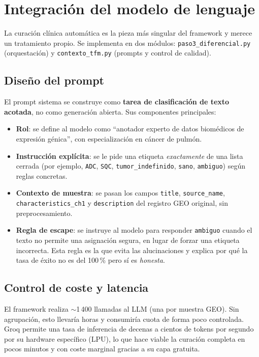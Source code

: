 \section{Integración del modelo de lenguaje}
\label{sec:dev_llm}

La curación clínica automática es la pieza más singular del framework y
merece un tratamiento propio. Se implementa en dos módulos:
\texttt{paso3\_diferencial.py} (orquestación) y \texttt{contexto\_tfm.py}
(prompts y control de calidad).

\subsection{Diseño del prompt}

El prompt sistema se construye como \textbf{tarea de clasificación de
texto acotada}, no como generación abierta. Sus componentes principales:

\begin{itemize}[leftmargin=1.2em]
  \item \textbf{Rol}: se define al modelo como ``anotador experto de
  datos biomédicos de expresión génica'', con especialización en cáncer
  de pulmón.
  \item \textbf{Instrucción explícita}: se le pide una etiqueta
  \emph{exactamente} de una lista cerrada (por ejemplo,
  \texttt{ADC}, \texttt{SQC}, \texttt{tumor\_indefinido}, \texttt{sano},
  \texttt{ambiguo}) según reglas concretas.
  \item \textbf{Contexto de muestra}: se pasan los campos
  \texttt{title}, \texttt{source\_name}, \texttt{characteristics\_ch1}
  y \texttt{description} del registro GEO original, sin
  preprocesamiento.
  \item \textbf{Regla de escape}: se instruye al modelo para responder
  \texttt{ambiguo} cuando el texto no permite una asignación segura, en
  lugar de forzar una etiqueta incorrecta. Esta regla es la que evita
  las alucinaciones y explica por qué la tasa de éxito no es del 100\,\%
  pero sí es \emph{honesta}.
\end{itemize}

\subsection{Control de coste y latencia}

El framework realiza $\sim$1\,400 llamadas al LLM (una por muestra
GEO). Sin agrupación, esto llevaría horas y consumiría cuota de forma
poco controlada. Groq permite una tasa de inferencia de decenas a
cientos de tokens por segundo por su hardware específico (LPU), lo que
hace viable la curación completa en pocos minutos y con coste marginal
gracias a su capa gratuita.

